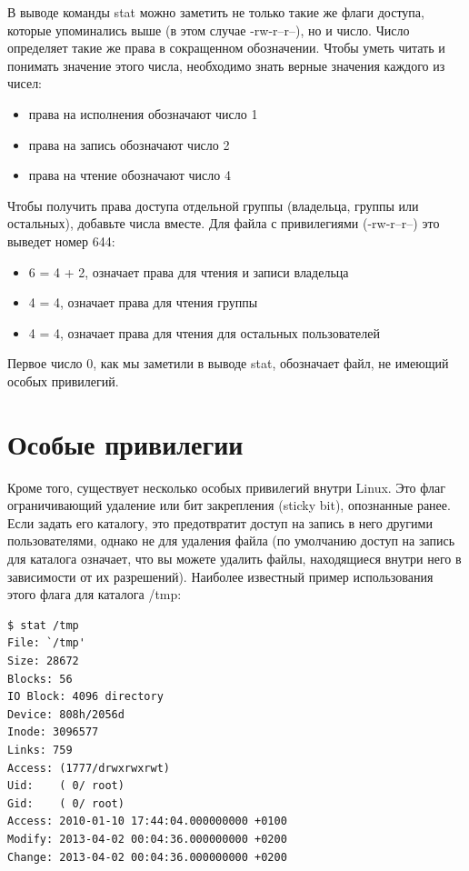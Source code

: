 \documentclass[10pt]{book}
\begin{document}
В выводе команды stat можно заметить не только такие же флаги доступа, которые упоминались выше (в этом случае -rw-r--r--), но и число.  Число определяет такие же права в сокращенном обозначении.
Чтобы уметь читать и понимать значение этого числа, необходимо знать верные значения каждого из чисел:

\begin{itemize}
\item права на исполнения обозначают число 1
\item права на запись обозначают число 2
\item права на чтение обозначают число 4
\end{itemize}

Чтобы получить права доступа отдельной группы (владельца, группы или остальных), добавьте числа вместе.
Для файла с привилегиями (-rw-r--r--) это выведет номер 644: 

\begin{itemize}
\item 6 = 4 + 2, означает права для чтения и записи владельца
\item 4 = 4, означает права для чтения группы
\item 4 = 4, означает права для чтения для остальных пользователей
\end{itemize}

Первое число 0, как мы заметили в выводе stat, обозначает файл, не имеющий особых привилегий. 

\section{Особые привилегии}

Кроме того, существует несколько особых привилегий внутри Linux.
Это флаг ограничивающий удаление или бит закрепления (sticky bit), опознанные ранее. Если задать его каталогу, это предотвратит доступ на запись в него другими пользователями, однако не для удаления файла (по умолчанию доступ на запись для каталога означает, что вы можете удалить файлы, находящиеся внутри него в зависимости от их разрешений). Наиболее известный пример использования этого флага для каталога /tmp:

\vspace{3mm}
\begin{tcolorbox}
\begin{lstlisting}
$ stat /tmp
File: `/tmp'
Size: 28672 
Blocks: 56 
IO Block: 4096 directory
Device: 808h/2056d 
Inode: 3096577 
Links: 759
Access: (1777/drwxrwxrwt) 
Uid: 	( 0/ root) 
Gid: 	( 0/ root)
Access: 2010-01-10 17:44:04.000000000 +0100
Modify: 2013-04-02 00:04:36.000000000 +0200
Change: 2013-04-02 00:04:36.000000000 +0200 
\end{lstlisting}
\end{tcolorbox}
\end{document}
